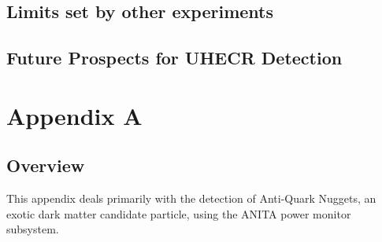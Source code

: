 \section{Limits set by other experiments}

\section{Future Prospects for UHECR Detection}


	
			
			
			
			
\chapter{Appendix A}
\section{Overview}
	This appendix deals primarily with the detection of Anti-Quark Nuggets, an exotic dark matter candidate particle, using the ANITA power monitor subsystem.
	
	
	
	
	

